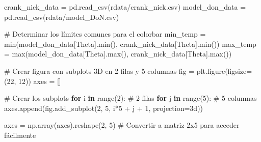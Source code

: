 \documentclass[
  spanish,
  us-letterpaper,
  DIV=11,
  numbers=noendperiod]{scrreprt}
\newenvironment{Shaded}{\begin{snugshade}}{\end{snugshade}}
\newcommand{\BuiltInTok}[1]{\textcolor[rgb]{0.00,0.23,0.31}{#1}}
\newcommand{\CommentTok}[1]{\textcolor[rgb]{0.37,0.37,0.37}{#1}}
\newcommand{\ControlFlowTok}[1]{\textcolor[rgb]{0.00,0.23,0.31}{\textbf{#1}}}
\newcommand{\DecValTok}[1]{\textcolor[rgb]{0.68,0.00,0.00}{#1}}
\newcommand{\KeywordTok}[1]{\textcolor[rgb]{0.00,0.23,0.31}{\textbf{#1}}}
\newcommand{\NormalTok}[1]{\textcolor[rgb]{0.00,0.23,0.31}{#1}}
\newcommand{\OperatorTok}[1]{\textcolor[rgb]{0.37,0.37,0.37}{#1}}
\newcommand{\StringTok}[1]{\textcolor[rgb]{0.13,0.47,0.30}{#1}}
\newcommand{\VerbatimStringTok}[1]{\textcolor[rgb]{0.13,0.47,0.30}{#1}}
\theoremstyle{plain}
\theoremstyle{definition}
\theoremstyle{remark}
\begin{document}
\begin{Shaded}
\begin{Highlighting}[]
\NormalTok{crank\_nick\_data }\OperatorTok{=}\NormalTok{ pd.read\_csv(}\VerbatimStringTok{r\textquotesingle{}data/crank\_nick}\DecValTok{.}\VerbatimStringTok{csv\textquotesingle{}}\NormalTok{)}
\NormalTok{model\_don\_data }\OperatorTok{=}\NormalTok{ pd.read\_csv(}\VerbatimStringTok{r\textquotesingle{}data/model\_DoN}\DecValTok{.}\VerbatimStringTok{csv\textquotesingle{}}\NormalTok{)}

\CommentTok{\# Determinar los límites comunes para el colorbar}
\NormalTok{min\_temp }\OperatorTok{=} \BuiltInTok{min}\NormalTok{(model\_don\_data[}\StringTok{\textquotesingle{}Theta\textquotesingle{}}\NormalTok{].}\BuiltInTok{min}\NormalTok{(), crank\_nick\_data[}\StringTok{\textquotesingle{}Theta\textquotesingle{}}\NormalTok{].}\BuiltInTok{min}\NormalTok{())}
\NormalTok{max\_temp }\OperatorTok{=} \BuiltInTok{max}\NormalTok{(model\_don\_data[}\StringTok{\textquotesingle{}Theta\textquotesingle{}}\NormalTok{].}\BuiltInTok{max}\NormalTok{(), crank\_nick\_data[}\StringTok{\textquotesingle{}Theta\textquotesingle{}}\NormalTok{].}\BuiltInTok{max}\NormalTok{())}

\CommentTok{\# Crear figura con subplots 3D en 2 filas y 5 columnas}
\NormalTok{fig }\OperatorTok{=}\NormalTok{ plt.figure(figsize}\OperatorTok{=}\NormalTok{(}\DecValTok{22}\NormalTok{, }\DecValTok{12}\NormalTok{))}
\NormalTok{axes }\OperatorTok{=}\NormalTok{ []}

\CommentTok{\# Crear los subplots}
\ControlFlowTok{for}\NormalTok{ i }\KeywordTok{in} \BuiltInTok{range}\NormalTok{(}\DecValTok{2}\NormalTok{):  }\CommentTok{\# 2 filas}
    \ControlFlowTok{for}\NormalTok{ j }\KeywordTok{in} \BuiltInTok{range}\NormalTok{(}\DecValTok{5}\NormalTok{):  }\CommentTok{\# 5 columnas}
\NormalTok{        axes.append(fig.add\_subplot(}\DecValTok{2}\NormalTok{, }\DecValTok{5}\NormalTok{, i}\OperatorTok{*}\DecValTok{5} \OperatorTok{+}\NormalTok{ j }\OperatorTok{+} \DecValTok{1}\NormalTok{, projection}\OperatorTok{=}\StringTok{\textquotesingle{}3d\textquotesingle{}}\NormalTok{))}

\NormalTok{axes }\OperatorTok{=}\NormalTok{ np.array(axes).reshape(}\DecValTok{2}\NormalTok{, }\DecValTok{5}\NormalTok{)  }\CommentTok{\# Convertir a matriz 2x5 para acceder fácilmente}


\end{Highlighting}
\end{Shaded}
\end{document}
